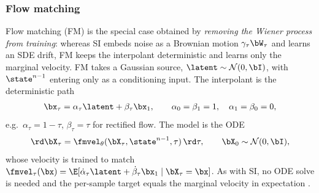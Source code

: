 


\subsubsection{Flow matching}
\label{subsec:fm}

Flow matching (FM) is the special case obtained by \emph{removing the Wiener process from training}: whereas SI embeds noise as a Brownian motion $\gamma_\tau\bW_\tau$ and learns an SDE drift, FM keeps the interpolant deterministic and learns only the marginal velocity. FM \cite{lipman_flow_2023, liu_rectified_2022} takes a Gaussian source, $\latent\sim\mathcal{N}(0,\bI)$, with $\state^{n-1}$ entering only as a conditioning input. The interpolant is the deterministic path
\begin{align}\label{eq:fm_interpolant}
    \bx_\tau = \alpha_\tau\latent + \beta_\tau\bx_1, \qquad \alpha_0=\beta_1=1,\quad \alpha_1=\beta_0=0,
\end{align}
e.g.\ $\alpha_\tau=1-\tau$, $\beta_\tau=\tau$ for rectified flow. The model is the ODE
\begin{align}\label{eq:fm_ode}
    \rd\bX_\tau = \fmvel_\theta(\bX_\tau,\state^{n-1},\tau)\,\rd\tau, \qquad \bX_0\sim\mathcal{N}(0,\bI),
\end{align}
whose velocity is trained to match $\fmvel_\tau(\bx) = \E[\dot\alpha_\tau\latent + \dot\beta_\tau\bx_1\mid\bX_\tau=\bx]$. As with SI, no ODE solve is needed and the per-sample target equals the marginal velocity in expectation \cite{lipman_flow_2023}. 


